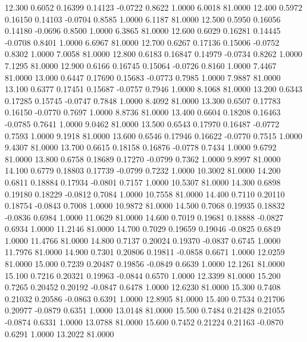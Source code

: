   12.300   0.6052   0.16399   0.14123  -0.0722   0.8622   1.0000   6.0018  81.0000
  12.400   0.5972   0.16150   0.14103  -0.0704   0.8585   1.0000   6.1187  81.0000
  12.500   0.5950   0.16056   0.14180  -0.0696   0.8500   1.0000   6.3865  81.0000
  12.600   0.6029   0.16281   0.14445  -0.0708   0.8401   1.0000   6.6967  81.0000
  12.700   0.6267   0.17136   0.15006  -0.0752   0.8302   1.0000   7.0058  81.0000
  12.800   0.6183   0.16847   0.14979  -0.0734   0.8262   1.0000   7.1295  81.0000
  12.900   0.6166   0.16745   0.15064  -0.0726   0.8160   1.0000   7.4467  81.0000
  13.000   0.6447   0.17690   0.15683  -0.0773   0.7985   1.0000   7.9887  81.0000
  13.100   0.6377   0.17451   0.15687  -0.0757   0.7946   1.0000   8.1068  81.0000
  13.200   0.6343   0.17285   0.15745  -0.0747   0.7848   1.0000   8.4092  81.0000
  13.300   0.6507   0.17783   0.16150  -0.0770   0.7697   1.0000   8.8736  81.0000
  13.400   0.6604   0.18208   0.16463  -0.0785   0.7641   1.0000   9.0462  81.0000
  13.500   0.6543   0.17970   0.16487  -0.0772   0.7593   1.0000   9.1918  81.0000
  13.600   0.6546   0.17946   0.16622  -0.0770   0.7515   1.0000   9.4307  81.0000
  13.700   0.6615   0.18158   0.16876  -0.0778   0.7434   1.0000   9.6792  81.0000
  13.800   0.6758   0.18689   0.17270  -0.0799   0.7362   1.0000   9.8997  81.0000
  14.100   0.6779   0.18803   0.17739  -0.0799   0.7232   1.0000  10.3002  81.0000
  14.200   0.6811   0.18884   0.17934  -0.0801   0.7157   1.0000  10.5307  81.0000
  14.300   0.6898   0.19180   0.18229  -0.0812   0.7084   1.0000  10.7558  81.0000
  14.400   0.7110   0.20110   0.18754  -0.0843   0.7008   1.0000  10.9872  81.0000
  14.500   0.7068   0.19935   0.18832  -0.0836   0.6984   1.0000  11.0629  81.0000
  14.600   0.7019   0.19681   0.18888  -0.0827   0.6934   1.0000  11.2146  81.0000
  14.700   0.7029   0.19659   0.19046  -0.0825   0.6849   1.0000  11.4766  81.0000
  14.800   0.7137   0.20024   0.19370  -0.0837   0.6745   1.0000  11.7976  81.0000
  14.900   0.7301   0.20806   0.19811  -0.0858   0.6671   1.0000  12.0259  81.0000
  15.000   0.7239   0.20487   0.19856  -0.0849   0.6639   1.0000  12.1261  81.0000
  15.100   0.7216   0.20321   0.19963  -0.0844   0.6570   1.0000  12.3399  81.0000
  15.200   0.7265   0.20452   0.20192  -0.0847   0.6478   1.0000  12.6230  81.0000
  15.300   0.7408   0.21032   0.20586  -0.0863   0.6391   1.0000  12.8905  81.0000
  15.400   0.7534   0.21706   0.20977  -0.0879   0.6351   1.0000  13.0148  81.0000
  15.500   0.7484   0.21428   0.21055  -0.0874   0.6331   1.0000  13.0788  81.0000
  15.600   0.7452   0.21224   0.21163  -0.0870   0.6291   1.0000  13.2022  81.0000
